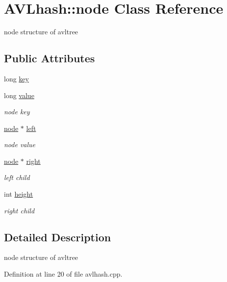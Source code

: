 \hypertarget{class_a_v_lhash_1_1node}{\section{A\-V\-Lhash\-:\-:node Class Reference}
\label{class_a_v_lhash_1_1node}
}


node structure of avltree  


\subsection*{Public Attributes}
\begin{DoxyCompactItemize}
\item 
long \hyperlink{class_a_v_lhash_1_1node_a17bc7500e27536b9104f1a90c1667fbd}{key}
\item 
long \hyperlink{class_a_v_lhash_1_1node_ae9a61d69f8a794835900ec366b8e71fd}{value}
\begin{DoxyCompactList}\small\item\em node key \end{DoxyCompactList}\item 
\hyperlink{class_a_v_lhash_1_1node}{node} $\ast$ \hyperlink{class_a_v_lhash_1_1node_a55e3b2e9d0542812dfd00071b797ed99}{left}
\begin{DoxyCompactList}\small\item\em node value \end{DoxyCompactList}\item 
\hyperlink{class_a_v_lhash_1_1node}{node} $\ast$ \hyperlink{class_a_v_lhash_1_1node_a719f17a801bc3a229cda943611df8821}{right}
\begin{DoxyCompactList}\small\item\em left child \end{DoxyCompactList}\item 
int \hyperlink{class_a_v_lhash_1_1node_a5f11a2a4597ccc27db767b939e487f0a}{height}
\begin{DoxyCompactList}\small\item\em right child \end{DoxyCompactList}\end{DoxyCompactItemize}


\subsection{Detailed Description}
node structure of avltree 

Definition at line 20 of file avlhash.\-cpp.



